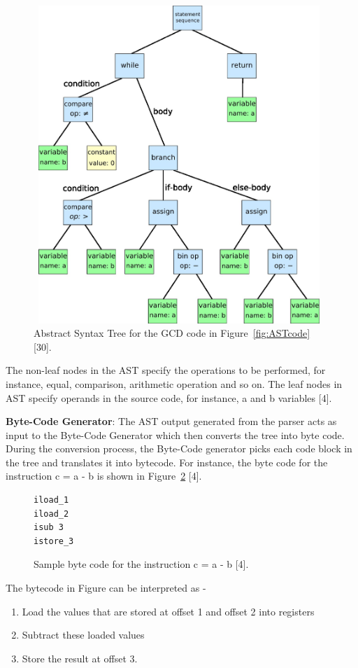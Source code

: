 \begin{figure}
  \centering
      \includegraphics[width=11cm, height=12cm]{AST.jpg}
    \caption[Abstract Syntax Tree]{Abstract Syntax Tree for the GCD code in Figure~\ref{fig:ASTcode} [30].}
    \label{fig:AST}
\end{figure}
The non-leaf nodes in the AST specify the operations to be performed, for instance, equal, comparison, arithmetic operation and so on. The leaf nodes in AST specify operands in the source code, for instance, a and b variables [4]. 

\textbf{Byte-Code Generator}: The AST output generated from the parser acts as input to the Byte-Code Generator which then converts the tree into byte code. During the conversion process, the Byte-Code generator picks each code block in the tree and translates it into bytecode. For instance, the byte code for the instruction c = a - b is shown in Figure~\ref{fig:samplebytecode} [4].

\begin{figure}
  \centering
\begin{lstlisting}
iload_1
iload_2
isub 3
istore_3
\end{lstlisting}
    \caption[Sample byte code]{Sample byte code for the instruction c = a - b [4].}
    \label{fig:samplebytecode}
\end{figure}

The bytecode in Figure can be interpreted as - 
\begin{enumerate}
\item Load the values that are stored at offset 1 and offset 2 into registers
\item Subtract these loaded values 
\item Store the result at offset 3.
\end{enumerate}


